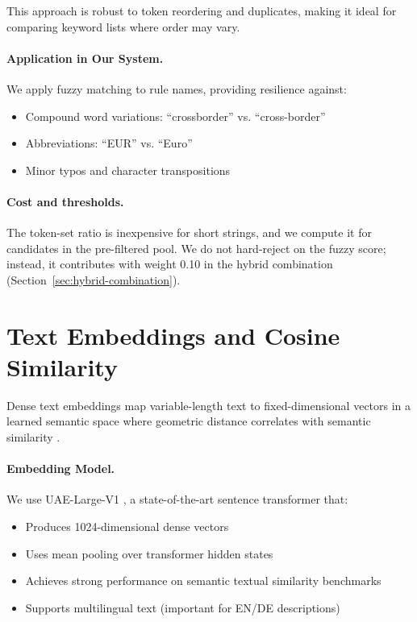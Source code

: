 This approach is robust to token reordering and duplicates, making it ideal for comparing keyword lists where order may vary.

\paragraph{Application in Our System.} We apply fuzzy matching to rule names, providing resilience against:
\begin{itemize}[leftmargin=*,itemsep=2pt,topsep=2pt]
 \item Compound word variations: ``crossborder'' vs. ``cross-border''
 \item Abbreviations: ``EUR'' vs. ``Euro''
 \item Minor typos and character transpositions
\end{itemize}

\paragraph{Cost and thresholds.} The token-set ratio is inexpensive for short strings, and we compute it for candidates in the pre-filtered pool. We do not hard-reject on the fuzzy score; instead, it contributes with weight 0.10 in the hybrid combination (Section~\ref{sec:hybrid-combination}).

\section{Text Embeddings and Cosine Similarity}
Dense text embeddings map variable-length text to fixed-dimensional vectors in a learned semantic space where geometric distance correlates with semantic similarity \cite{mikolov2013distributed, reimers2019sentence}. 

\paragraph{Embedding Model.} We use UAE-Large-V1 \cite{uae-large}, a state-of-the-art sentence transformer that:
\begin{itemize}[leftmargin=*,itemsep=2pt,topsep=2pt]
 \item Produces 1024-dimensional dense vectors
 \item Uses mean pooling over transformer hidden states
 \item Achieves strong performance on semantic textual similarity benchmarks
 \item Supports multilingual text (important for EN/DE descriptions)
\end{itemize}

